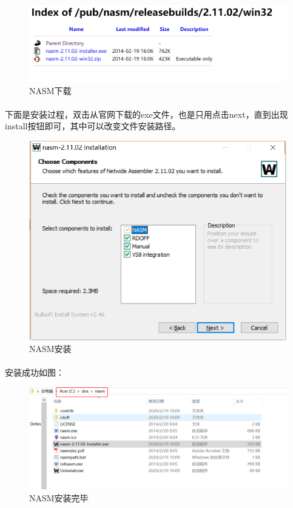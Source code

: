 \documentclass[12pt]{article}
\begin{document}
		\begin{figure}[H]
			\centering
			\includegraphics[width=14cm]{./figures/NASMD2.png}
			\caption{NASM下载} 
		\end{figure}


	\paragraph{}下面是安装过程，双击从官网下载的exe文件，也是只用点击next，直到出现install按钮即可，其中可以改变文件安装路径。
		\begin{figure}[H]
			\centering
			\includegraphics[width=14cm]{./figures/Install1.png}
			\caption{NASM安装} 
		\end{figure}	

	\paragraph{}安装成功如图：
		\begin{figure}[H]
			\centering
			\includegraphics[width=14cm]{./figures/Install3.png}
			\caption{NASM安装完毕} 
		\end{figure}	
\end{document}
